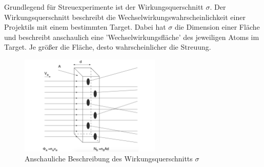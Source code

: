Grundlegend für Streuexperimente ist der Wirkungsquerschnitt $\sigma$.
Der Wirkungsquerschnitt beschreibt die Wechselwirkungswahrscheinlichkeit einer Projektils mit einem bestimmten Target.
Dabei hat $\sigma$ die Dimension einer Fläche und beschreibt anschaulich eine 'Wechselwirkungsfläche' des jeweiligen Atoms im Target.
Je größer die Fläche, desto wahrscheinlicher die Streuung.
\begin{figure}[h!]
  \centering
  \includegraphics[width=0.6\textwidth]{images/wq.pdf}
  \caption{Anschauliche Beschreibung des Wirkungsquerschnitts $\sigma$ \cite{povh}}
  \label{fig:wq}
\end{figure}

%
%
